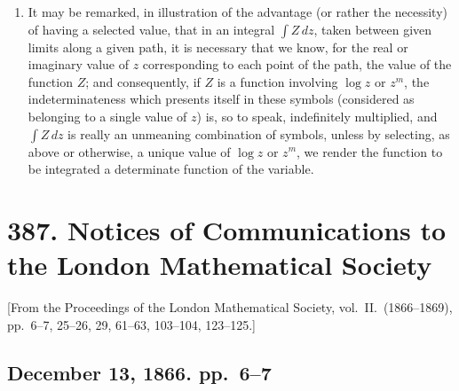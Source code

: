 \documentclass[12pt,a4paper]{article}
\theoremstyle{plain}
\theoremstyle{definition}
\theoremstyle{remark}
\begin{document}
\begin{enumerate}[label=\arabic*.]
We have thus a definition of the value of $(x + iy)^{m}$, and the value so defined may be called the \emph{selected value}.

And similarly, for an imaginary exponent $m = p + qi$, we have
\begin{align*}
(x + iy)^{p+qi} &= e^{(p+qi)(\log r + i\theta)} \\
&= e^{p\log r - q\theta + i(p\theta + q\log r)} \\
&= r^{p} e^{-q\theta} \cdot e^{i(p\theta + q\log r)}
\end{align*}
which is the selected value of $(x + iy)^{p+qi}$.

\item It may be remarked, in illustration of the advantage (or rather the necessity) of having a selected value, that in an integral $\displaystyle\int Z\, dz$, taken between given limits along a given path, it is necessary that we know, for the real or imaginary value of $z$ corresponding to each point of the path, the value of the function $Z$; and consequently, if $Z$ is a function involving $\log z$ or $z^{m}$, the indeterminateness which presents itself in these symbols (considered as belonging to a single value of $z$) is, so to speak, indefinitely multiplied, and $\displaystyle\int Z\, dz$ is really an unmeaning combination of symbols, unless by selecting, as above or otherwise, a unique value of $\log z$ or $z^{m}$, we render the function to be integrated a determinate function of the variable.
\end{enumerate}



\section*{387. Notices of Communications to the London Mathematical Society}

\begin{center}
\small [From the Proceedings of the London Mathematical Society, vol.~II.\ (1866--1869),\\
pp.~6--7, 25--26, 29, 61--63, 103--104, 123--125.]
\end{center}

\subsection*{December 13, 1866. pp.~6--7}
\end{document}
